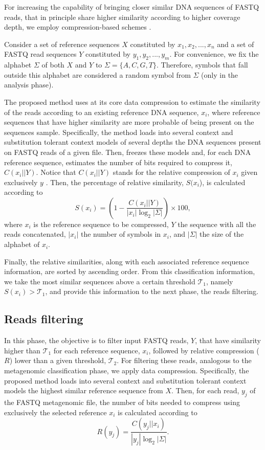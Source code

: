 \documentclass[smallabstract,smallcaptions]{dccpaper}
\begin{document}
For increasing the capability of bringing closer similar DNA sequences of FASTQ reads, that in principle share higher similarity according to higher coverage depth, we employ compression-based schemes \cite{pratas2018metagenomic,pratas2018metagenomic2}. 

Consider a set of reference sequences $X$ constituted by $x_1, x_2, ..., x_n$ and a set of FASTQ read sequences $Y$ constituted by $y_1, y_2, ..., y_m$. For convenience, we fix the alphabet $\Sigma$ of both $X$ and $Y$ to $\Sigma=\{A, C, G, T\}$. Therefore, symbols that fall outside this alphabet are considered a random symbol from $\Sigma$ (only in the analysis phase). 

The proposed method uses at its core data compression to estimate the similarity of the reads according to an existing reference DNA sequence, $x_i$, where reference sequences that have higher similarity are more probable of being present on the sequences sample. Specifically, the method loads into several context and substitution tolerant context models of several depths the DNA sequences present on FASTQ reads of a given file. Then, freezes these models and, for each DNA reference sequence, estimates the number of bits required to compress it, $C(x_i||Y)$. Notice that $C(x_i||Y)$ stands for the relative compression of $x_i$ given exclusively $y$ \cite{pinho2016authorship}. Then, the percentage of relative similarity, $S(x_i$), is calculated according to 
\begin{equation}
    S(x_i) = \left(1 - \frac{C(x_i||Y)}{|x_i| \log_2|\Sigma|}\right) \times 100,
\end{equation}
where $x_i$ is the reference sequence to be compressed, $Y$ the sequence with all the reads concatenated, $|x_i|$ the number of symbols in $x_i$, and $|\Sigma|$ the size of the alphabet of $x_i$.

Finally, the relative similarities, along with each associated reference sequence information, are sorted by ascending order. From this classification information, we take the most similar sequences above a certain threshold $\mathcal{T}_1$, namely $S(x_i) > \mathcal{T}_1$, and provide this information to the next phase, the reads filtering.

\subsection*{Reads filtering}

In this phase, the objective is to filter input FASTQ reads, $Y$, that have similarity higher than $\mathcal{T}_1$ for each reference sequence, $x_i$, followed by relative compression ($R$) lower than a given threshold, $\mathcal{T}_2$. For filtering these reads, analogous to the metagenomic classification phase, we apply data compression. Specifically, the proposed method loads into several context and substitution tolerant context models the highest similar reference sequence from $X$. Then, for each read, $y_j$ of the FASTQ metagenomic file, the number of bits needed to compress using exclusively the selected reference $x_i$ is calculated according to
\begin{equation}
    R(y_j) = \frac{C(y_j||x_i)}{|y_j|\log_2|\Sigma|}.
\end{equation}
\end{document}
